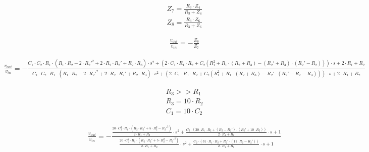 \begin{align}
    &Z_7 = \frac{R_3 \cdot Z_4}{R_3 + Z_4} \label{eq:ej5_z7} \\
    &Z_8 = \frac{R_3 \cdot Z_6}{R_3 + Z_6} \label{eq:ej5_z8}
\end{align}

\begin{align}
    &\frac{v_{out}}{v_{in}} = - \frac{Z_8}{Z_7}
\end{align}

\begin{ssmall}
\begin{adjustwidth*}{-1.3cm}{}
    \begin{align}
        &\frac{v_{out}}{v_{in}} = - \frac{C_1 \cdot C_2 \cdot R_1 \cdot \left(R_1 \cdot R_2 - 2 \cdot R_2'^2 + 2 \cdot R_2 \cdot R_2' + R_2 \cdot R_3\right) \cdot s^2 +
                                        \left(2 \cdot C_1 \cdot R_1 \cdot R_2 + C_2 \left(R_1^2 + R_1 \cdot \left(R_2 + R_3\right) - \left(R_2' + R_3\right) \cdot \left(R_2' - R_2\right)\right)\right) \cdot s +
                                        2 \cdot R_1 + R_2}
                                        {C_1 \cdot C_2 \cdot R_1 \cdot \left(R_1 \cdot R_2 - 2 \cdot R_2'^2 + 2 \cdot R_2 \cdot R_2' + R_2 \cdot R_3\right) \cdot s^2 +
                                        \left(2 \cdot C_1 \cdot R_1 \cdot R_2 + C_2 \left(R_1^2 + R_1 \cdot \left(R_2 + R_3\right) - R_2' \cdot \left(R_2' - R_2 - R_3\right)\right)\right) \cdot s +
                                        2 \cdot R_1 + R_2} \label{eq:ej5_complete_transference}
    \end{align}
\end{adjustwidth*}
\end{ssmall}

\begin{align}
    &R_3 >> R_1 \\
    &R_3 = 10 \cdot R_2 \\
    &C_1 = 10 \cdot C_2
\end{align}

\begin{align}
    &\frac{v_{out}}{v_{in}} = - \frac{\frac{20 \cdot C_2^2 \cdot R_1 \cdot \left(R_2 \cdot R_2' + 5 \cdot R_2^2 - R_2'^2\right)}{2 \cdot R_1 + R_2} \cdot s^2 +
                                        \frac{C_2 \cdot \left(30 \cdot R_1 \cdot R_2 + \left(R_2 - R_2'\right) \cdot \left(R_2' + 10 \cdot R_2\right)\right)}{2 \cdot R_1 + R_2} \cdot s +
                                        1}
                                        {\frac{20 \cdot C_2^2 \cdot R_1 \cdot \left(R_2 \cdot R_2' + 5 \cdot R_2^2 - R_2'^2\right)}{2 \cdot R_1 + R_2} \cdot s^2 +
                                        \frac{C_2 \cdot \left(31 \cdot R_1 \cdot R_2 + R_2' \cdot \left(11 \cdot R_2 - R_2'\right)\right)}{2 \cdot R_1 + R_2} \cdot s +
                                        1} \label{eq:ej5_approx_transference}
\end{align}

